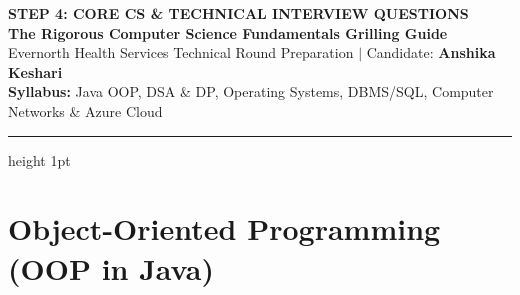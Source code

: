 \documentclass[11pt,a4paper]{article}
\begin{document}
\begin{center}
    {\LARGE \bfseries \color{primaryblue} STEP 4: CORE CS \& TECHNICAL INTERVIEW QUESTIONS}\\[4pt]
    {\large \bfseries The Rigorous Computer Science Fundamentals Grilling Guide}\\[2pt]
    {\small \color{darkcharcoal} Evernorth Health Services Technical Round Preparation $|$ Candidate: \textbf{Anshika Keshari}}\\[2pt]
    {\footnotesize \textbf{Syllabus:} Java OOP, DSA \& DP, Operating Systems, DBMS/SQL, Computer Networks \& Azure Cloud}
\end{center}
\vspace{-4pt}
\hrule height 1pt
\vspace{8pt}

\section{Object-Oriented Programming (OOP in Java)}
\end{document}
